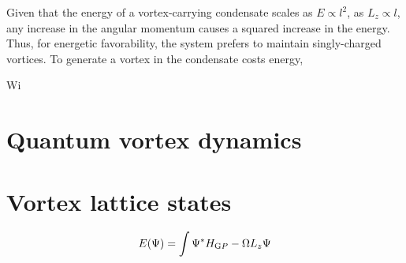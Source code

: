 Given that the energy of a vortex-carrying condensate scales as $E\propto l^2$, as $L_z \propto l$, any increase in the angular momentum causes a squared increase in the energy. Thus, for energetic favorability, the system prefers to maintain singly-charged vortices. To generate a vortex in the condensate costs energy,

Wi

\section{Quantum vortex dynamics}



\section{Vortex lattice states}
    \begin{equation}
        E(\Psi) = \int \Psi^{*} H_{\text GP} -\Omega L_z \Psi
    \end{equation}
